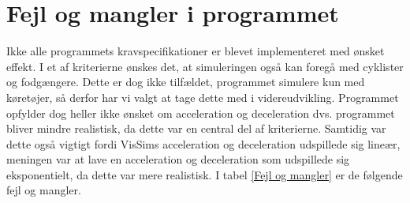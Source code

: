 \section{Fejl og mangler i programmet}\label{FejlOgMangler}
Ikke alle programmets kravspecifikationer er blevet implementeret med ønsket effekt. I et af kriterierne ønskes det, at simuleringen også kan foregå med cyklister og fodgængere. Dette er dog ikke tilfældet, programmet simulere kun med køretøjer, så derfor har vi valgt at tage dette med i videreudvikling. Programmet opfylder dog heller ikke ønsket om acceleration og deceleration dvs. programmet bliver mindre realistisk, da dette var en central del af kriterierne. Samtidig var dette også vigtigt fordi VisSims acceleration og deceleration udspillede sig lineær, meningen var at lave en acceleration og deceleration som udspillede sig eksponentielt, da dette var mere realistisk. I tabel \ref{Fejl og mangler} er de følgende fejl og mangler.

